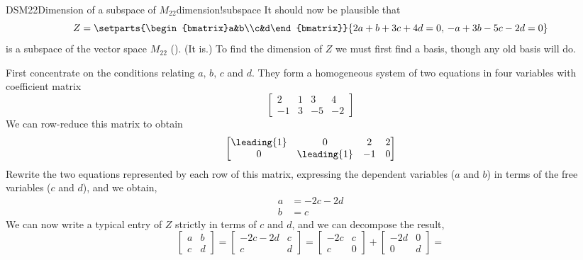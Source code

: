 %
\begin{example}{DSM22}{Dimension of a subspace of $M_{22}$}{dimension!subspace}
It should now be plausible that 
%
\begin{equation*}
Z=\setparts{\begin{bmatrix}a&b\\c&d\end{bmatrix}}{2a+b+3c+4d=0,\,-a+3b-5c-2d=0}
\end{equation*}
%
is a subspace of the vector space $M_{22}$ ().  (It is.)  To find the dimension of $Z$ we must first find a basis, though any old basis will do.\par
%
First concentrate on the conditions relating $a,\,b,\,c$ and $d$.  They form a homogeneous system of two equations in four variables with coefficient matrix
%
\begin{equation*}
\begin{bmatrix}
2 & 1 & 3 & 4\\
-1 & 3 & -5 & -2
\end{bmatrix}
\end{equation*}
%
We can row-reduce this matrix to obtain
%
\begin{equation*}
\begin{bmatrix}
\leading{1} & 0 & 2 & 2\\
0 & \leading{1} & -1 & 0
\end{bmatrix}
\end{equation*}
%
Rewrite the two equations represented by each row of this matrix, expressing the dependent variables ($a$ and $b$) in terms of the free variables ($c$ and $d$), and we obtain,
%
\begin{align*}
a&=-2c-2d\\
b&=c
\end{align*}
%
We can now write a typical entry of $Z$ strictly in terms of $c$ and $d$, and we can decompose the result,
%
\begin{equation*}
\begin{bmatrix}a&b\\c&d\end{bmatrix}=
\begin{bmatrix}-2c-2d&c\\c&d\end{bmatrix}=
%
\begin{bmatrix}-2c&c\\c&0\end{bmatrix}+
\begin{bmatrix}-2d&0\\0&d\end{bmatrix}=

\end{equation*}
\end{example}

